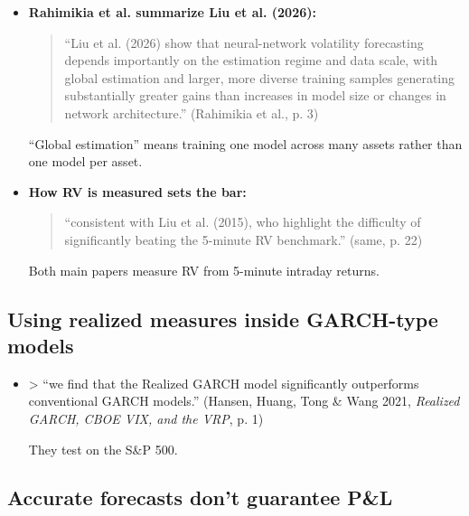 \documentclass{article}
\begin{document}
\begin{itemize}

\item \textbf{Rahimikia et al. summarize Liu et al. (2026):}

\begin{quote}``Liu et al. (2026) show that neural-network volatility forecasting depends importantly on the estimation regime and data scale, with global estimation and larger, more diverse training samples generating substantially greater gains than increases in model size or changes in network architecture.'' (Rahimikia et al., p. 3)\end{quote}

``Global estimation'' means training one model across many assets rather than one model per asset.

\item \textbf{How RV is measured sets the bar:}

\begin{quote}``consistent with Liu et al. (2015), who highlight the difficulty of significantly beating the 5-minute RV benchmark.'' (same, p. 22)\end{quote}

Both main papers measure RV from 5-minute intraday returns.

\end{itemize}

\subsection{Using realized measures inside GARCH-type models}

\begin{itemize}

\item

> ``we find that the Realized GARCH model significantly outperforms conventional GARCH models.'' (Hansen, Huang, Tong \& Wang 2021, \emph{Realized GARCH, CBOE VIX, and the VRP}, p. 1)

They test on the S\&P 500.

\end{itemize}

\subsection{Accurate forecasts don't guarantee P\&L}
\end{document}
